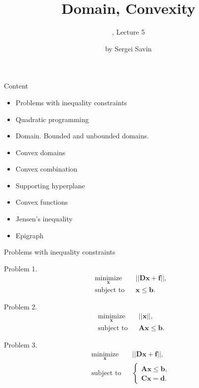 \documentclass{beamer}
\title{Domain, Convexity}
\subtitle{\mycoursetitle, Lecture 5}
\author{by Sergei Savin}
\date{\mydate}
\begin{document}
\maketitle


\begin{frame}{Content}

\begin{itemize}
\item Problems with inequality constraints
\item Quadratic programming
\item Domain. Bounded and unbounded domains.
\item Convex domains
\item Convex combination
\item Supporting hyperplane
\item Convex functions
\item Jensen’s inequality
\item Epigraph
\end{itemize}

\end{frame}




\begin{frame}{Problems with inequality constraints}
\begin{flushleft}

Problem 1. 
%
\begin{equation}
\begin{aligned}
& \underset{\mathbf{x}}{\text{minimize}}
& & || \mathbf{D}\mathbf{x} + \mathbf{f} ||, \\
& \text{subject to}
& & \mathbf{x} \leq \mathbf{b}.
\end{aligned}
\end{equation}

Problem 2. 
%
\begin{equation}
\begin{aligned}
& \underset{\mathbf{x}}{\text{minimize}}
& & || \mathbf{x} ||, \\
& \text{subject to}
& & \mathbf{A}\mathbf{x} \leq \mathbf{b}.
\end{aligned}
\end{equation}

Problem 3. 
%
\begin{equation}
\begin{aligned}
& \underset{\mathbf{x}}{\text{minimize}}
& & || \mathbf{D}\mathbf{x} + \mathbf{f} ||, \\
& \text{subject to}
& & \begin{cases}
    \mathbf{A}\mathbf{x} \leq \mathbf{b}, \\
    \mathbf{C}\mathbf{x} = \mathbf{d}.
    \end{cases}
\end{aligned}
\end{equation}

\end{flushleft}
\end{frame}
\end{document}
